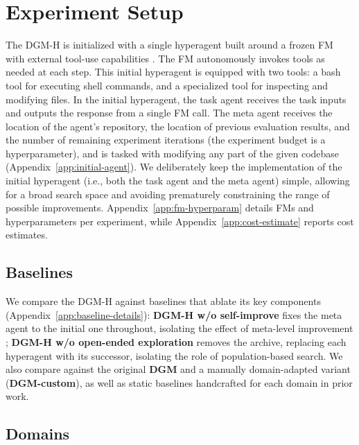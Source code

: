 \section{Experiment Setup}
\label{sec:exp-setup}

The DGM-H is initialized with a single hyperagent built around a frozen FM \citep{brown2020language} with external tool-use capabilities \citep{schick2023toolformer}. The FM autonomously invokes tools as needed at each step. This initial hyperagent is equipped with two tools: a bash tool for executing shell commands, and a specialized tool for inspecting and modifying files. In the initial hyperagent, the task agent receives the task inputs and outputs the response from a single FM call. The meta agent receives the location of the agent's repository, the location of previous evaluation results, and the number of remaining experiment iterations (the experiment budget is a hyperparameter), and is tasked with modifying any part of the given codebase (Appendix~\ref{app:initial-agent}). We deliberately keep the implementation of the initial hyperagent (i.e., both the task agent and the meta agent) simple, allowing for a broad search space and avoiding prematurely constraining the range of possible improvements. Appendix~\ref{app:fm-hyperparam} details FMs and hyperparameters per experiment, while Appendix~\ref{app:cost-estimate} reports cost estimates.

\subsection{Baselines}
\label{sec:baselines}

We compare the DGM-H against baselines that ablate its key components (Appendix~\ref{app:baseline-details}): \textbf{DGM-H w/o self-improve} fixes the meta agent to the initial one throughout, isolating the effect of meta-level improvement \citep{huautomated}; \textbf{DGM-H w/o open-ended exploration} removes the archive, replacing each hyperagent with its successor, isolating the role of population-based search. We also compare against the original \textbf{DGM} \citep{zhang2025darwin} and a manually domain-adapted variant (\textbf{DGM-custom}), as well as static baselines handcrafted for each domain in prior work.

\subsection{Domains}
\label{sec:domains}


